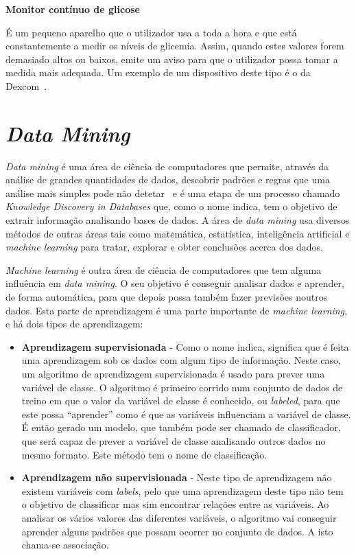 \textbf{Monitor contínuo de glicose}

É um pequeno aparelho que o utilizador usa a toda a hora e que está constantemente a medir os níveis de glicemia. Assim, quando estes valores forem demasiado altos ou baixos, emite um aviso para que o utilizador possa tomar a medida mais adequada. Um exemplo de um dispositivo deste tipo é o da Dexcom~\cite{cgm}.


\section{\textit{Data Mining}}

\textit{Data mining} é uma área de ciência de computadores que permite, através da análise de grandes quantidades de dados, descobrir padrões e regras que uma análise mais simples pode não detetar~\cite{oracle} e é uma etapa de um processo chamado \textit{Knowledge Discovery in Databases} que, como o nome indica, tem o objetivo de extrair informação analisando bases de dados.
A área de \textit{data mining} usa diversos métodos de outras áreas tais como matemática, estatística, inteligência artificial e \textit{machine learning} para tratar, explorar e obter conclusões acerca dos dados. 

\textit{Machine learning} é outra área de ciência de computadores que tem alguma influência em \textit{data mining}. O seu objetivo é conseguir analisar dados e aprender, de forma automática, para que depois possa também fazer previsões noutros dados. Esta parte de aprendizagem é uma parte importante de \textit{machine learning}, e há dois tipos de aprendizagem:

\begin{itemize}
\item \textbf{Aprendizagem supervisionada} - Como o nome indica, significa que é feita uma aprendizagem sob os dados com algum tipo de informação. Neste caso, um algoritmo de aprendizagem supervisionada é usado para prever uma variável de classe. O algoritmo é primeiro corrido num conjunto de dados de treino em que o valor da variável de classe é conhecido, ou \textit{labeled}, para que este possa ``aprender'' como é que as variáveis influenciam a variável de classe. É então gerado um modelo, que também pode ser chamado de classificador, que será capaz de prever a variável de classe analisando outros dados no mesmo formato. Este método tem o nome de classificação.

\item \textbf{Aprendizagem não supervisionada} - Neste tipo de aprendizagem não existem variáveis com \textit{labels}, pelo que uma aprendizagem deste tipo não tem o objetivo de classificar mas sim encontrar relações entre as variáveis. Ao analisar os vários valores das diferentes variáveis, o algoritmo vai conseguir aprender alguns padrões que possam ocorrer no conjunto de dados. A isto chama-se associação.
\end{itemize}

